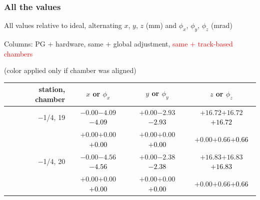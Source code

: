 \documentclass[compress]{beamer}
\begin{document}
\begin{frame}
\frametitle{All the values}
\tiny

All values relative to ideal, alternating $x$, $y$, $z$ (mm) and $\phi_x$, $\phi_y$, $\phi_z$ (mrad)

Columns: PG $+$ hardware, same $+$ global adjustment, \textcolor{red}{same $+$ track-based chambers}

\hfill (color applied only if chamber was aligned)

\vfill
\renewcommand{\arraystretch}{1.1}
\begin{tabular}{r | c | c | c}
station, chamber & $x$ or $\phi_x$ & $y$ or $\phi_y$ & $z$ or $\phi_z$ \\\hline
$-$1/4, 19 & $-0.00$\hspace{0.1 cm}$-4.09$\hspace{0.1 cm}\textcolor{black}{$-4.09$} & $+0.00$\hspace{0.1 cm}$-2.93$\hspace{0.1 cm}\textcolor{black}{$-2.93$} & $+16.72$\hspace{0.1 cm}$+16.72$\hspace{0.1 cm}\textcolor{black}{$+16.72$} \\
           & $+0.00$\hspace{0.1 cm}$+0.00$\hspace{0.1 cm}\textcolor{black}{$+0.00$} & $+0.00$\hspace{0.1 cm}$+0.00$\hspace{0.1 cm}\textcolor{black}{$+0.00$} & $+0.00$\hspace{0.1 cm}$+0.66$\hspace{0.1 cm}\textcolor{black}{$+0.66$} \\
$-$1/4, 20 & $-0.00$\hspace{0.1 cm}$-4.56$\hspace{0.1 cm}\textcolor{black}{$-4.56$} & $+0.00$\hspace{0.1 cm}$-2.38$\hspace{0.1 cm}\textcolor{black}{$-2.38$} & $+16.83$\hspace{0.1 cm}$+16.83$\hspace{0.1 cm}\textcolor{black}{$+16.83$} \\
           & $+0.00$\hspace{0.1 cm}$+0.00$\hspace{0.1 cm}\textcolor{black}{$+0.00$} & $+0.00$\hspace{0.1 cm}$+0.00$\hspace{0.1 cm}\textcolor{black}{$+0.00$} & $+0.00$\hspace{0.1 cm}$+0.66$\hspace{0.1 cm}\textcolor{black}{$+0.66$} \\

\end{tabular}
\end{frame}
\end{document}
